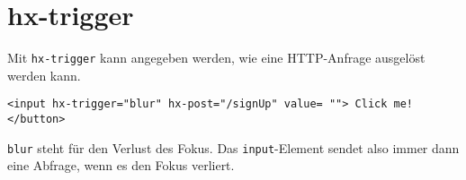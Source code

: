 \documentclass[a4paper]{scrartcl}
\begin{document}
\section{hx-trigger}
Mit \texttt{hx-trigger} kann angegeben werden, wie eine HTTP-Anfrage ausgelöst werden kann. 

\begin{verbatim}
<input hx-trigger="blur" hx-post="/signUp" value= ""> Click me! </button>
\end{verbatim}

\texttt{blur} steht für den Verlust des Fokus.
Das \texttt{input}-Element sendet also immer dann eine Abfrage, wenn es den Fokus verliert.
\end{document}
